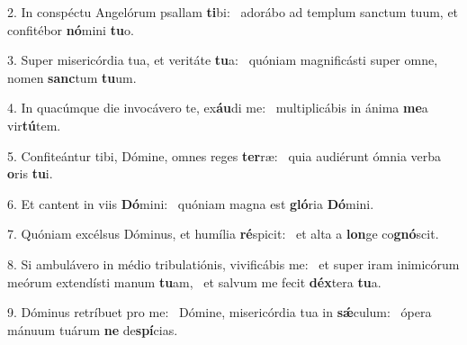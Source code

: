 2. In conspéctu Angelórum psallam \textbf{ti}bi: \ast\  adorábo ad templum sanctum tuum, et confitébor \textbf{nó}mini \textbf{tu}o.\

3. Super misericórdia tua, et veritáte \textbf{tu}a: \ast\  quóniam magnificásti super omne, nomen \textbf{sanc}tum \textbf{tu}um.\

4. In quacúmque die invocávero te, ex\textbf{áu}di me: \ast\  multiplicábis in ánima \textbf{me}a vir\textbf{tú}tem.\

5. Confiteántur tibi, Dómine, omnes reges \textbf{ter}ræ: \ast\  quia audiérunt ómnia verba \textbf{o}ris \textbf{tu}i.\

6. Et cantent in viis \textbf{Dó}mini: \ast\  quóniam magna est \textbf{gló}ria \textbf{Dó}mini.\

7. Quóniam excélsus Dóminus, et humília \textbf{ré}spicit: \ast\  et alta a \textbf{lon}ge co\textbf{gnó}scit.\

8. Si ambulávero in médio tribulatiónis, vivificábis me: \dag\  et super iram inimicórum meórum extendísti manum \textbf{tu}am, \ast\  et salvum me fecit \textbf{déx}tera \textbf{tu}a.\

9. Dóminus retríbuet pro me: \dag\  Dómine, misericórdia tua in \textbf{sǽ}culum: \ast\  ópera mánuum tuárum \textbf{ne} de\textbf{spí}cias.\

